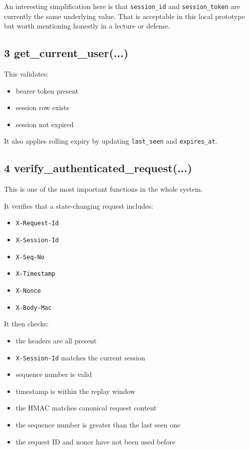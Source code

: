 \documentclass[11pt,a4paper]{article}
\begin{document}
An interesting simplification here is that \nolinkurl{session_id} and \nolinkurl{session_token} are currently the same underlying value. That is acceptable in this local prototype but worth mentioning honestly in a lecture or defense.

\subsection{3 get\_current\_user(...)}

This validates:

\begin{itemize}
\item bearer token present
\item session row exists
\item session not expired
\end{itemize}

It also applies rolling expiry by updating \nolinkurl{last_seen} and \nolinkurl{expires_at}.

\subsection{4 verify\_authenticated\_request(...)}

This is one of the most important functions in the whole system.

It verifies that a state-changing request includes:

\begin{itemize}
\item \nolinkurl{X-Request-Id}
\item \nolinkurl{X-Session-Id}
\item \nolinkurl{X-Seq-No}
\item \nolinkurl{X-Timestamp}
\item \nolinkurl{X-Nonce}
\item \nolinkurl{X-Body-Mac}
\end{itemize}

It then checks:

\begin{itemize}
\item the headers are all present
\item \nolinkurl{X-Session-Id} matches the current session
\item sequence number is valid
\item timestamp is within the replay window
\item the HMAC matches canonical request content
\item the sequence number is greater than the last seen one
\item the request ID and nonce have not been used before
\end{itemize}
\end{document}

